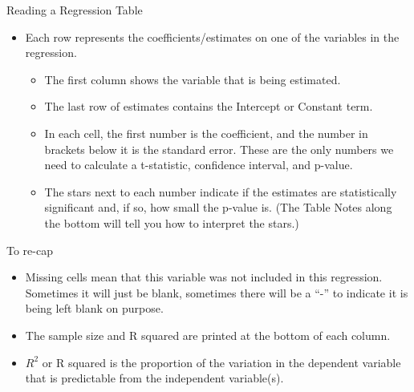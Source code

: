 \documentclass[
  11pt,
  ignorenonframetext,
]{beamer}
\providecommand{\tightlist}{%
  \setlength{\itemsep}{0pt}\setlength{\parskip}{0pt}}
\begin{document}
\begin{frame}{Reading a Regression Table}
\protect{}\label{reading-a-regression-table-1}
\begin{itemize}
\tightlist
\item
  Each row represents the coefficients/estimates on one of the variables
  in the regression. \pause

  \begin{itemize}
  \tightlist
  \item
    The first column shows the variable that is being estimated. \pause
  \item
    The last row of estimates contains the Intercept or Constant term.
    \pause
  \item
    In each cell, the first number is the coefficient, and the number in
    brackets below it is the standard error. These are the only numbers
    we need to calculate a t-statistic, confidence interval, and
    p-value. \pause
  \item
    The stars next to each number indicate if the estimates are
    statistically significant and, if so, how small the p-value is. (The
    Table Notes along the bottom will tell you how to interpret the
    stars.)
  \end{itemize}
\end{itemize}
\end{frame}

\begin{frame}{To re-cap}
\protect{}\label{to-re-cap}
\begin{itemize}
\tightlist
\item
  Missing cells mean that this variable was not included in this
  regression. Sometimes it will just be blank, sometimes there will be a
  ``-'' to indicate it is being left blank on purpose. \pause
\item
  The sample size and R squared are printed at the bottom of each
  column. \pause
\item
  \(R^2\) or R squared is the proportion of the variation in the
  dependent variable that is predictable from the independent
  variable(s).
\end{itemize}
\end{frame}
\end{document}
